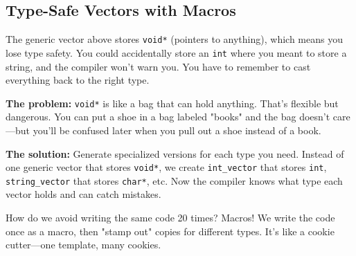 \subsection{Type-Safe Vectors with Macros}

The generic vector above stores \texttt{void*} (pointers to anything), which means you lose type safety. You could accidentally store an \texttt{int} where you meant to store a string, and the compiler won't warn you. You have to remember to cast everything back to the right type.

\textbf{The problem:} \texttt{void*} is like a bag that can hold anything. That's flexible but dangerous. You can put a shoe in a bag labeled "books" and the bag doesn't care---but you'll be confused later when you pull out a shoe instead of a book.

\textbf{The solution:} Generate specialized versions for each type you need. Instead of one generic vector that stores \texttt{void*}, we create \texttt{int\_vector} that stores \texttt{int}, \texttt{string\_vector} that stores \texttt{char*}, etc. Now the compiler knows what type each vector holds and can catch mistakes.

How do we avoid writing the same code 20 times? Macros! We write the code once as a macro, then "stamp out" copies for different types. It's like a cookie cutter---one template, many cookies.

